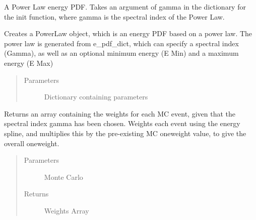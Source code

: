 \documentclass[letterpaper,10pt,english]{sphinxmanual}
\begin{document}

\begin{fulllineitems}
A Power Law energy PDF. Takes an argument of gamma in the dictionary
for the init function, where gamma is the spectral index of the Power Law.

\begin{fulllineitems}
Creates a PowerLaw object, which is an energy PDF based on a power
law. The power law is generated from e\_pdf\_dict, which can specify a
spectral index (Gamma), as well as an optional minimum energy (E Min)
and a maximum energy (E Max)
\begin{quote}\begin{description}
\item[{Parameters}] \leavevmode
{} \textendash{} Dictionary containing parameters

\end{description}\end{quote}

\end{fulllineitems}


\begin{fulllineitems}
Returns an array containing the weights for each MC event,
given that the spectral index gamma has been chosen. Weights each
event using the energy spline, and multiplies this by the
pre-existing MC oneweight value, to give the overall oneweight.
\begin{quote}\begin{description}
\item[{Parameters}] \leavevmode
{} \textendash{} Monte Carlo

\item[{Returns}] \leavevmode
Weights Array

\end{description}\end{quote}

\end{fulllineitems}


\end{fulllineitems}
\end{document}
